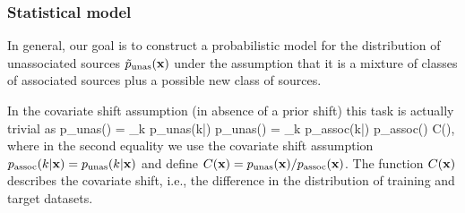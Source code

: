 \subsubsection{Statistical model}
\label{sec:stat-model}

In general, our goal is to construct a probabilistic model for the distribution of unassociated sources $\tilde{p}_{\rm unas}(\textbf{x})$ under the assumption that it is a mixture of classes of associated sources plus a possible new class of sources.

In the covariate shift assumption (in absence of a prior shift) this task is actually trivial as
\be
\label{eq:cov0}
p_{\rm unas}(\bx) 
= \sum_k p_{\rm unas}(k|\bx) p_{\rm unas}(\bx) 
= \sum_k p_{\rm assoc}(k|\bx) p_{\rm assoc}(\bx) C(\bx),
\ee
where in the second equality we use the covariate shift assumption $p_{\rm assoc}(k|\textbf{x}) = p_{\rm unas}(k|\textbf{x})$ and define $C(\textbf{x}) = p_{\rm unas}(\textbf{x}) / p_{\rm assoc}(\textbf{x})$.
The function $C(\textbf{x})$ describes the covariate shift, i.e., the difference in the distribution of training and target datasets.

